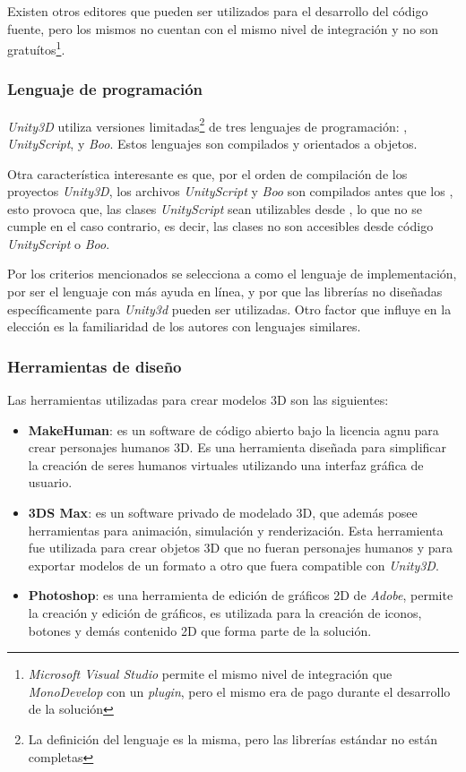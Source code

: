 Existen otros editores que pueden ser utilizados para el desarrollo del código
fuente, pero los mismos no cuentan con el mismo nivel de integración y no son
gratuítos\footnote{\textit{Microsoft Visual Studio} permite el mismo nivel de
    integración que \textit{MonoDevelop} con un \textit{plugin}, pero el mismo
    era de pago durante el desarrollo de la solución}.

\subsubsection{Lenguaje de programación}

\textit{Unity3D} utiliza versiones limitadas\footnote{La definición del lenguaje
    es la misma, pero las librerías estándar no están completas} de tres
lenguajes de programación: \cs{}, \textit{UnityScript}, y
\textit{Boo}\cite{unity:script}. Estos lenguajes son compilados y orientados a
objetos.

Otra característica interesante es que, por el orden de compilación de los
proyectos \textit{Unity3D}, los archivos \textit{UnityScript} y \textit{Boo} son
compilados antes que los \cs{}, esto provoca que, las clases
\textit{UnityScript} sean utilizables desde \cs{}, lo que no se cumple en el
caso contrario, es decir, las clases \cs{} no son accesibles desde código
\textit{UnityScript} o \textit{Boo}.

Por los criterios mencionados se selecciona a \cs{} como el lenguaje de
implementación, por ser el lenguaje con más ayuda en línea, y por que las
librerías no diseñadas específicamente para \textit{Unity3d} pueden ser
utilizadas. Otro factor que influye en la elección es la familiaridad de los
autores con lenguajes similares. 

\subsubsection{Herramientas de diseño}

Las herramientas utilizadas para crear modelos 3D son las siguientes:

\begin{itemize}
\item \textbf{MakeHuman}: es un software de código abierto bajo la licencia
    \Gls{agnu} para crear personajes humanos 3D. Es una herramienta diseñada
    para simplificar la creación de seres humanos virtuales utilizando una
    interfaz gráfica de usuario\cite{makehuman}. 
\item \textbf{3DS Max}: es un software privado de modelado 3D, que además posee
    herramientas para animación, simulación y renderización. Esta herramienta
    fue utilizada para crear objetos 3D que no fueran personajes humanos y para
    exportar modelos de un formato a otro que fuera compatible con
    \textit{Unity3D}\cite{3dsmax}.
\item \textbf{Photoshop}: es una herramienta de edición de gráficos 2D de
    \textit{Adobe}, permite la creación y edición de gráficos, es utilizada para
    la creación de iconos, botones y demás contenido 2D que forma parte de la
    solución.
\end{itemize}


